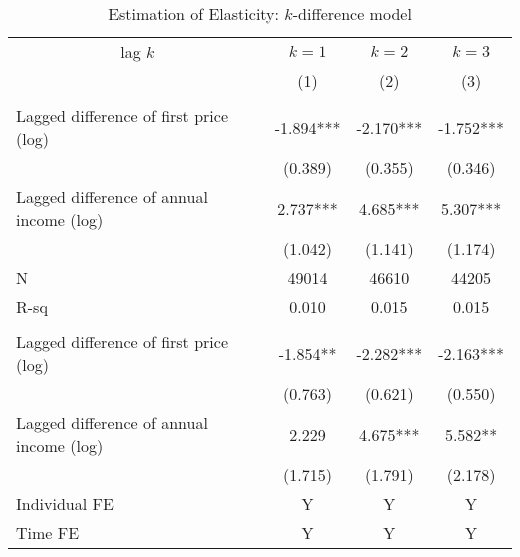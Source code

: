 \documentclass[ review  , 3p ]{elsarticle}
\begin{document}
  \begin{table}
  
  \caption{\label{tab:kablekDiffElasticity}Estimation of Elasticity: $k$-difference model}
  \centering
  \fontsize{8}{10}\selectfont
  \begin{threeparttable}
  \begin{tabular}[t]{lccc}
  \toprule
  \multicolumn{1}{c}{lag $k$} & \multicolumn{1}{c}{$k = 1$} & \multicolumn{1}{c}{$k = 2$} & \multicolumn{1}{c}{$k = 3$} \\
  \cmidrule(l{3pt}r{3pt}){1-1} \cmidrule(l{3pt}r{3pt}){2-2} \cmidrule(l{3pt}r{3pt}){3-3} \cmidrule(l{3pt}r{3pt}){4-4}
   & (1) & (2) & (3)\\
  \midrule
  \addlinespace[0.3em]
  \multicolumn{4}{l}{\textbf{Overall Elasticity}}\\
  \hspace{1em}Lagged difference of first price (log) & -1.894*** & -2.170*** & -1.752***\\
  \hspace{1em} & (0.389) & (0.355) & (0.346)\\
  \hspace{1em}Lagged difference of annual income (log) & 2.737*** & 4.685*** & 5.307***\\
  \hspace{1em} & (1.042) & (1.141) & (1.174)\\
  \hspace{1em}N & 49014 & 46610 & 44205\\
  \hspace{1em}R-sq & 0.010 & 0.015 & 0.015\\
  \addlinespace[0.3em]
  \multicolumn{4}{l}{\textbf{Intensive-Margin Elasticity}}\\
  \hspace{1em}Lagged difference of first price (log) & -1.854** & -2.282*** & -2.163***\\
  \hspace{1em} & (0.763) & (0.621) & (0.550)\\
  \hspace{1em}Lagged difference of annual income (log) & 2.229 & 4.675*** & 5.582**\\
  \hspace{1em} & (1.715) & (1.791) & (2.178)\\
  \hspace{1em}Individual FE & Y & Y & Y\\
  \hspace{1em}Time FE & Y & Y & Y\\

\end{tabular}
\end{threeparttable}
\end{table}
\end{document}
